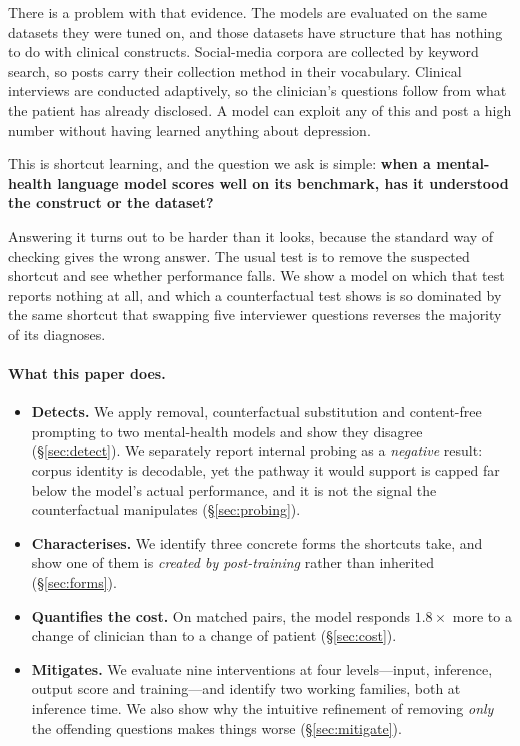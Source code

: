 \documentclass{article}
\begin{document}
There is a problem with that evidence. The models are evaluated on the same
datasets they were tuned on, and those datasets have structure that has nothing
to do with clinical constructs. Social-media corpora are collected by keyword
search, so posts carry their collection method in their vocabulary. Clinical
interviews are conducted adaptively, so the clinician's questions follow from
what the patient has already disclosed. A model can exploit any of this and post
a high number without having learned anything about depression.

This is shortcut learning, and the question we ask is simple: \textbf{when a
mental-health language model scores well on its benchmark, has it understood the
construct or the dataset?}

Answering it turns out to be harder than it looks, because the standard way of
checking gives the wrong answer. The usual test is to remove the suspected
shortcut and see whether performance falls. We show a model on which that test
reports nothing at all, and which a counterfactual test shows is so dominated by
the same shortcut that swapping five interviewer questions reverses the majority
of its diagnoses.

\paragraph{What this paper does.}

\begin{itemize}
\item \textbf{Detects.} We apply removal, counterfactual substitution and
      content-free prompting to two mental-health models and show they disagree
      (\S\ref{sec:detect}). We separately report internal probing as a
      \emph{negative} result: corpus identity is decodable, yet the pathway it
      would support is capped far below the model's actual performance, and it
      is not the signal the counterfactual manipulates (\S\ref{sec:probing}).
\item \textbf{Characterises.} We identify three concrete forms the shortcuts
      take, and show one of them is \emph{created by post-training} rather than
      inherited (\S\ref{sec:forms}).
\item \textbf{Quantifies the cost.} On matched pairs, the model responds
      $1.8\times$ more to a change of clinician than to a change of patient
      (\S\ref{sec:cost}).
\item \textbf{Mitigates.} We evaluate nine interventions at four levels---input,
      inference, output score and training---and identify two working families,
      both at inference time. We also show why the intuitive refinement of
      removing \emph{only} the offending questions makes things worse
      (\S\ref{sec:mitigate}).
\end{itemize}
\end{document}
